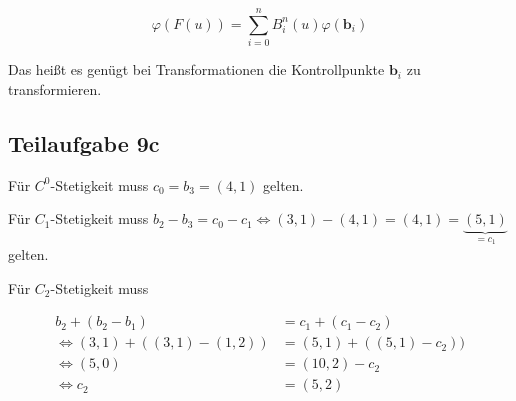 \documentclass[a4paper]{scrartcl}
\begin{document}
\[\varphi(F(u)) = \sum_{i=0}^n B_i^n(u) \varphi(\mathbf{b}_i)\]

Das heißt es genügt bei Transformationen die Kontrollpunkte $\mathbf{b}_i$
zu transformieren.

\subsection*{Teilaufgabe 9c}
Für $C^0$-Stetigkeit muss $c_0 = b_3 = (4, 1)$ gelten.

Für $C_1$-Stetigkeit muss $b_2 - b_3 = c_0 - c_1 \Leftrightarrow (3,1) - (4,1) = (4,1) = \underbrace{(5,1)}_{= c_1}$ gelten.

Für $C_2$-Stetigkeit muss

\begin{align}
    b_2 + (b_2 - b_1) &= c_1 + (c_1 - c_2)\\
    \Leftrightarrow (3,1) + ((3,1) - (1,2)) &= (5,1) + ((5,1) - c_2))\\
    \Leftrightarrow (5, 0) &= (10, 2) - c_2\\
    \Leftrightarrow c_2 &= (5, 2)
\end{align}
\end{document}
